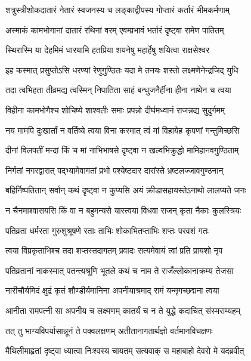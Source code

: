 \twolineshloka
{शत्रुस्त्रीशोकदातारं नेतारं स्वजनस्य च}
{लङ्काद्वीपस्य गोप्तारं कर्तारं भीमकर्मणाम्} %

\twolineshloka
{अस्माकं कामभोगानां दातारं रथिनां वरम्}
{एवम्प्रभावं भर्तारं दृष्ट्वा रामेण पातितम्} %

\twolineshloka
{स्थिरास्मि या देहमिमं धारयामि हतप्रिया}
{शयनेषु महार्हेषु शयित्वा राक्षसेश्वर} %

\twolineshloka
{इह कस्मात् प्रसुप्तोऽसि धरण्यां रेणुगुण्ठितः}
{यदा मे तनयः शस्तो लक्ष्मणेनेन्द्रजिद् युधि} %

\twolineshloka
{तदा त्वभिहता तीव्रमद्य त्वस्मिन् निपातिता}
{साहं बन्धुजनैर्हीना हीना नाथेन च त्वया} %

\twolineshloka
{विहीना कामभोगैश्च शोचिष्ये शाश्वतीः समाः}
{प्रपन्नो दीर्घमध्वानं राजन्नद्य सुदुर्गमम्} %

\twolineshloka
{नय मामपि दुःखार्तां न वर्तिष्ये त्वया विना}
{कस्मात् त्वं मां विहायेह कृपणां गन्तुमिच्छसि} %

\twolineshloka
{दीनां विलपतीं मन्दां किं च मां नाभिभाषसे}
{दृष्ट्वा न खल्वभिक्रुद्धो मामिहानवगुण्ठिताम्} %

\twolineshloka
{निर्गतां नगरद्वारात् पद्भ्यामेवागतां प्रभो}
{पश्येष्टदार दारांस्ते भ्रष्टलज्जावगुण्ठनान्} %

\twolineshloka
{बहिर्निष्पतितान् सर्वान् कथं दृष्ट्वा न कुप्यसि}
{अयं क्रीडासहायस्तेऽनाथो लालप्यते जनः} %

\twolineshloka
{न चैनमाश्वासयसि किं वा न बहुमन्यसे}
{यास्त्वया विधवा राजन् कृता नैकाः कुलस्त्रियः} %

\twolineshloka
{पतिव्रता धर्मरता गुरुशुश्रूषणे रताः}
{ताभिः शोकाभितप्ताभिः शप्तः परवशं गतः} %

\twolineshloka
{त्वया विप्रकृताभिश्च तदा शप्तस्तदागतम्}
{प्रवादः सत्यमेवायं त्वां प्रति प्रायशो नृप} %

\twolineshloka
{पतिव्रतानां नाकस्मात् पतन्त्यश्रूणि भूतले}
{कथं च नाम ते राजँल्लोकानाक्रम्य तेजसा} %

\twolineshloka
{नारीचौर्यमिदं क्षुद्रं कृतं शौण्डीर्यमानिना}
{अपनीयाश्रमाद् रामं यन्मृगच्छद्मना त्वया} %

\twolineshloka
{आनीता रामपत्नी सा अपनीय च लक्ष्मणम्}
{कातर्यं च न ते युद्धे कदाचित् संस्मराम्यहम्} %

\twolineshloka
{तत् तु भाग्यविपर्यासान्नूनं ते पक्वलक्षणम्}
{अतीतानागतार्थज्ञो वर्तमानविचक्षणः} %

\twolineshloka
{मैथिलीमाहृतां दृष्ट्वा ध्यात्वा निःश्वस्य चायतम्}
{सत्यवाक् स महाबाहो देवरो मे यदब्रवीत्} %

